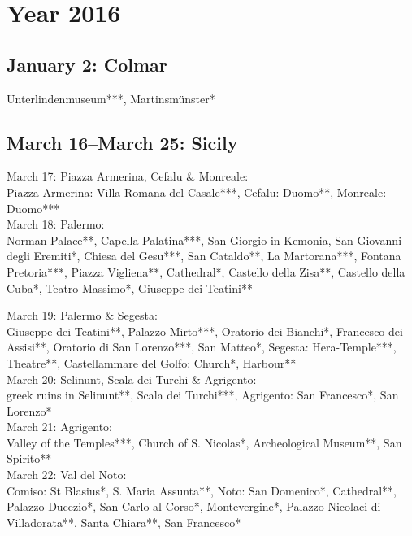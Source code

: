 \chapter{Year 2016}
\label{2016}

\section{January 2: Colmar}
\label{Colmar2016}

Unterlindenmuseum***, Martinsm\"unster*

\section{March 16--March 25: Sicily}
\label{Sicily2016}

March 17: Piazza Armerina, Cefalu \& Monreale:\\
Piazza Armerina: Villa Romana del Casale***, Cefalu: Duomo**, Monreale: Duomo***\\

March 18: Palermo:\\
Norman Palace**, Capella Palatina***, San Giorgio in Kemonia, San Giovanni degli Eremiti*, Chiesa del Gesu***, San Cataldo**, La Martorana***, Fontana Pretoria***, Piazza Vigliena**, Cathedral*, Castello della Zisa**, Castello della Cuba*, Teatro Massimo*, Giuseppe dei Teatini**

March 19: Palermo \& Segesta:\\
Giuseppe dei Teatini**, Palazzo Mirto***, Oratorio dei Bianchi*, Francesco dei Assisi**, Oratorio di San Lorenzo***, San Matteo*, Segesta: Hera-Temple***, Theatre**, Castellammare del Golfo: Church*, Harbour**\\

March 20: Selinunt, Scala dei Turchi \& Agrigento:\\
greek ruins in Selinunt**, Scala dei Turchi***, Agrigento: San Francesco*, San Lorenzo*\\

March 21: Agrigento:\\
Valley of the Temples***, Church of S. Nicolas*, Archeological Museum**, San Spirito**\\

March 22: Val del Noto:\\
Comiso: St Blasius*, S. Maria Assunta**, Noto: San Domenico*, Cathedral**, Palazzo Ducezio*, San Carlo al Corso*, Montevergine*, Palazzo Nicolaci di Villadorata**, Santa Chiara**, San Francesco*\\

